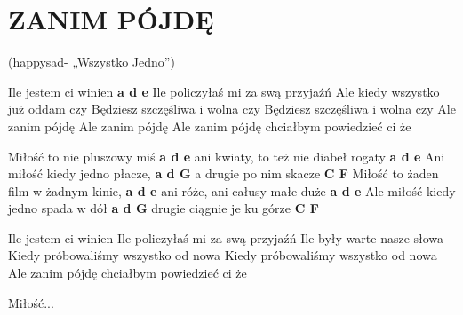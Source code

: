 \documentclass[../../../songbook.tex]{subfiles}
\begin{document}
\section*{ZANIM PÓJDĘ}


(happysad- „Wszystko Jedno”) \newline

Ile jestem ci winien				\textbf{a d e} \newline
Ile policzyłaś mi za swą przyjaźń			\newline
Ale kiedy wszystko już oddam czy 			\newline
Będziesz szczęśliwa i wolna czy 			\newline
Będziesz szczęśliwa i wolna czy 			\newline
Ale zanim pójdę 					        \newline
Ale zanim pójdę 					        \newline
Ale zanim pójdę chciałbym powiedzieć ci że	\newline	  

Miłość to nie pluszowy miś				\textbf{a d e} \newline
ani kwiaty, to też nie diabeł rogaty 	\textbf{a d e} \newline
Ani miłość kiedy jedno płacze,			\textbf{a d G} \newline
a drugie po nim skacze					\textbf{C F}   \newline
Miłość to żaden film w żadnym kinie, 	\textbf{a d e} \newline
ani róże, ani całusy małe duże 			\textbf{a d e} \newline
Ale miłość kiedy jedno spada w dół  	\textbf{a d G} \newline
drugie ciągnie je ku górze  			\textbf{C F}   \newline

Ile jestem ci winien                        \newline
Ile policzyłaś mi za swą przyjaźń           \newline
Ile były warte nasze słowa                  \newline
Kiedy próbowaliśmy wszystko od nowa         \newline
Kiedy próbowaliśmy wszystko od nowa         \newline
Ale zanim pójdę chciałbym powiedzieć ci że  \newline

Miłość...
\end{document}

